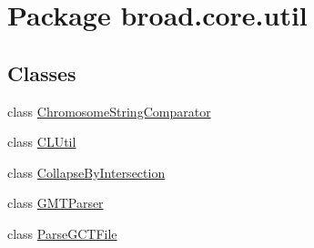\hypertarget{namespacebroad_1_1core_1_1util}{\section{Package broad.\+core.\+util}
\label{namespacebroad_1_1core_1_1util}
}
\subsection*{Classes}
\begin{DoxyCompactItemize}
\item 
class \hyperlink{classbroad_1_1core_1_1util_1_1_chromosome_string_comparator}{Chromosome\+String\+Comparator}
\item 
class \hyperlink{classbroad_1_1core_1_1util_1_1_c_l_util}{C\+L\+Util}
\item 
class \hyperlink{classbroad_1_1core_1_1util_1_1_collapse_by_intersection}{Collapse\+By\+Intersection}
\item 
class \hyperlink{classbroad_1_1core_1_1util_1_1_g_m_t_parser}{G\+M\+T\+Parser}
\item 
class \hyperlink{classbroad_1_1core_1_1util_1_1_parse_g_c_t_file}{Parse\+G\+C\+T\+File}
\end{DoxyCompactItemize}
